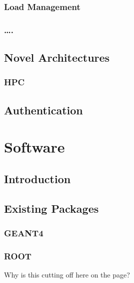 \subsubsection{Load Management}
\label{ch:exec-comp-mod-evlv-load}


\subsubsection{….}
\label{ch:exec-comp-mod-evlv-}


\subsection{Novel Architectures}	
\label{ch:exec-comp-mod-nov}

\subsubsection{HPC}
\label{ch:exec-comp-mod-nov-hpc}

\subsection{Authentication}	
\label{ch:exec-comp-mod-auth}


\section{Software}		
\label{ch:exec-comp-sw}


\subsection{Introduction}	
\label{ch:exec-comp-sw-int}


\subsection{Existing Packages}	
\label{ch:exec-comp-sw-int-pkg}


\subsubsection{GEANT4}
\label{ch:exec-comp-sw-int-gnt}


\subsubsection{ROOT}
\label{ch:exec-comp-sw-int-root}
Why is this cutting off here on the page?

